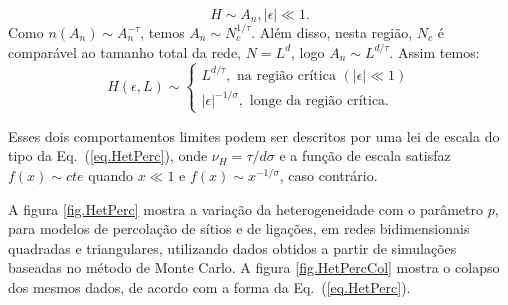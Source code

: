 $$
H\sim A_n, |\epsilon|\ll 1.
$$
Como $n(A_n) \sim A_n^{-\tau}$, temos $A_n \sim N_c^{1/\tau}$. Além disso, nesta região, $N_c$ é comparável ao tamanho total da rede, $N=L^d$, logo $A_n \sim L^{d/\tau}$. Assim temos:
\begin{equation}
H(\epsilon,L) \sim \left\{
\begin{array}{l}
L^{d/\tau}, \text{ na região crítica } (|\epsilon|\ll 1) \\
|\epsilon|^{-1/\sigma}, \text{ longe da região crítica.}
\end{array}
\right. 
\end{equation} 

Esses dois comportamentos limites podem ser descritos por uma lei de escala do tipo da Eq.~(\ref{eq.HetPerc}), onde $\nu_H=\tau/d\sigma$ e a função de escala satisfaz $f(x)\sim cte$ quando $x\ll 1$ e $f(x)\sim x^{-1/\sigma}$, caso contrário.

A figura \ref{fig.HetPerc} mostra a variação da heterogeneidade com o parâmetro $p$, para modelos de percolação de sítios e de ligações, em redes bidimensionais quadradas e triangulares, utilizando dados obtidos a partir de simulações baseadas no método de Monte Carlo. A figura \ref{fig.HetPercCol} mostra o colapso dos mesmos dados, de acordo com a forma da Eq.~(\ref{eq.HetPerc}).

